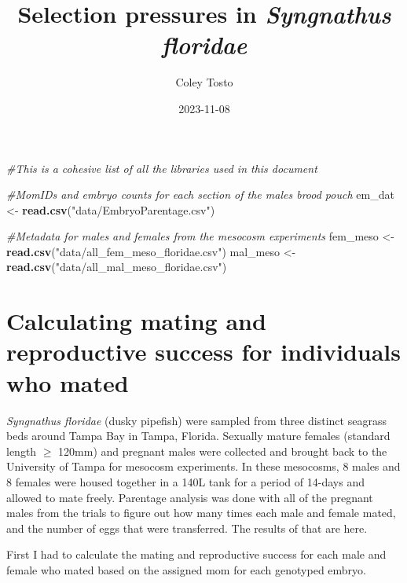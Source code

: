 \documentclass[
]{article}
\title{Selection pressures in \emph{Syngnathus floridae}}
\author{Coley Tosto}
\date{2023-11-08}
\newenvironment{Shaded}{\begin{snugshade}}{\end{snugshade}}
\newcommand{\CommentTok}[1]{\textcolor[rgb]{0.56,0.35,0.01}{\textit{#1}}}
\newcommand{\FunctionTok}[1]{\textcolor[rgb]{0.13,0.29,0.53}{\textbf{#1}}}
\newcommand{\NormalTok}[1]{#1}
\newcommand{\OtherTok}[1]{\textcolor[rgb]{0.56,0.35,0.01}{#1}}
\newcommand{\StringTok}[1]{\textcolor[rgb]{0.31,0.60,0.02}{#1}}
\begin{document}
\maketitle

\begin{Shaded}
\begin{Highlighting}[]
\CommentTok{\#This is a cohesive list of all the libraries used in this document}
\end{Highlighting}
\end{Shaded}

\begin{Shaded}
\begin{Highlighting}[]
\CommentTok{\#MomIDs and embryo counts for each section of the male\textquotesingle{}s brood pouch}
\NormalTok{em\_dat }\OtherTok{\textless{}{-}} \FunctionTok{read.csv}\NormalTok{(}\StringTok{"data/EmbryoParentage.csv"}\NormalTok{)}

\CommentTok{\#Metadata for males and females from the mesocosm experiments}
\NormalTok{fem\_meso }\OtherTok{\textless{}{-}} \FunctionTok{read.csv}\NormalTok{(}\StringTok{"data/all\_fem\_meso\_floridae.csv"}\NormalTok{)}
\NormalTok{mal\_meso }\OtherTok{\textless{}{-}} \FunctionTok{read.csv}\NormalTok{(}\StringTok{"data/all\_mal\_meso\_floridae.csv"}\NormalTok{)}
\end{Highlighting}
\end{Shaded}

\hypertarget{calculating-mating-and-reproductive-success-for-individuals-who-mated}{%
\section{Calculating mating and reproductive success for individuals who mated}\label{calculating-mating-and-reproductive-success-for-individuals-who-mated}}

\emph{Syngnathus floridae} (dusky pipefish) were sampled from three distinct seagrass beds around Tampa Bay in Tampa, Florida. Sexually mature females (standard length \(\ge\) 120mm) and pregnant males were collected and brought back to the University of Tampa for mesocosm experiments. In these mesocosms, 8 males and 8 females were housed together in a 140L tank for a period of 14-days and allowed to mate freely. Parentage analysis was done with all of the pregnant males from the trials to figure out how many times each male and female mated, and the number of eggs that were transferred. The results of that are here.

First I had to calculate the mating and reproductive success for each male and female who mated based on the assigned mom for each genotyped embryo.
\end{document}
